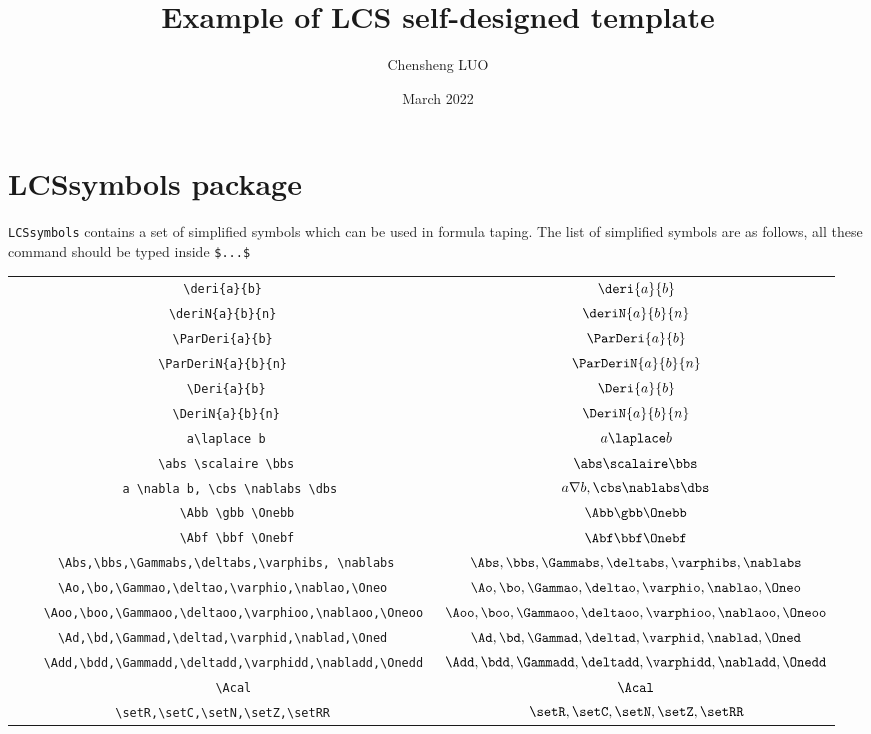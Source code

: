 \documentclass{CSArticle}[english]
\title{\textbf{Example of LCS self-designed template}}
\author{Chensheng LUO}
\date{March 2022}
\begin{document}
\MakeSimpleTitle

\section{LCSsymbols package}\verb|LCSsymbols| contains a set of simplified symbols which can be used in formula taping. The list of simplified symbols are as follows, all these command should be typed inside \verb|$...$|
\begin{table}[h]
\centering
\begin{tabular}{|c|c|}
\hline
 \verb|\deri{a}{b}| &  $\deri{a}{b}$\\
 \verb|\deriN{a}{b}{n}|& $\deriN{a}{b}{n}$\\
\verb|	  \ParDeri{a}{b}	| & $	  \ParDeri{a}{b}	$\\
\verb|	  \ParDeriN{a}{b}{n}	| & $	  \ParDeriN{a}{b}{n}	$\\
\verb|	  \Deri{a}{b}	| & $	  \Deri{a}{b}	$\\
\verb|	  \DeriN{a}{b}{n}	| & $	  \DeriN{a}{b}{n}	$\\
\verb|	  a\laplace b	| & $	  a\laplace b	$\\
\verb|	  \abs \scalaire \bbs	| & $	  \abs \scalaire \bbs	$\\
\verb|	   a \nabla b, \cbs \nablabs \dbs	| & $	   a \nabla b, \cbs \nablabs \dbs	$\\
\verb|	  \Abb \gbb	\Onebb| & $	  \Abb \gbb	\Onebb$\\
\verb|	  \Abf \bbf	\Onebf| & $	  \Abf \bbf	\Onebf$\\
\verb|	  \Abs,\bbs,\Gammabs,\deltabs,\varphibs, \nablabs	| & $	  \Abs,\bbs,\Gammabs,\deltabs,\varphibs, \nablabs	$\\
\verb|	  \Ao,\bo,\Gammao,\deltao,\varphio,\nablao,\Oneo	| & $	  \Ao,\bo,\Gammao,\deltao,\varphio,\nablao,\Oneo	$\\
\verb|	  \Aoo,\boo,\Gammaoo,\deltaoo,\varphioo,\nablaoo,\Oneoo	| & $	  \Aoo,\boo,\Gammaoo,\deltaoo,\varphioo,\nablaoo	,\Oneoo$\\
\verb|	  \Ad,\bd,\Gammad,\deltad,\varphid,\nablad,\Oned	| & $	  \Ad,\bd,\Gammad,\deltad,\varphid,\nablad,\Oned	$\\
\verb|	  \Add,\bdd,\Gammadd,\deltadd,\varphidd,\nabladd,\Onedd	| & $	  \Add,\bdd,\Gammadd,\deltadd,\varphidd,\nabladd,\Onedd	$\\
\verb|	  \Acal	| & $	  \Acal	$\\
\verb|	  \setR,\setC,\setN,\setZ,\setRR	| & $	  \setR,\setC,\setN,\setZ,\setRR	$\\

\end{tabular}
\end{table}
\end{document}

